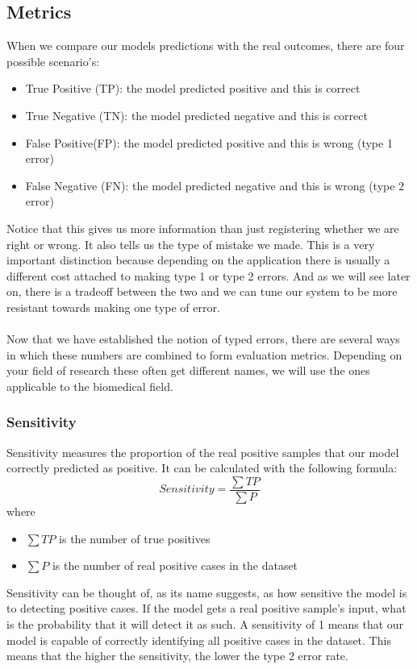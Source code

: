 \subsection{Metrics}
When we compare our models predictions with the real outcomes, there are four possible scenario's:
\begin{itemize}
	\item True Positive (TP): the model predicted positive and this is correct
	\item True Negative (TN): the model predicted negative and this is correct
	\item False Positive(FP): the model predicted positive and this is wrong (type 1 error)
	\item False Negative (FN): the model predicted negative and this is wrong (type 2 error)
\end{itemize}
Notice that this gives us more information than just registering whether we are right or wrong. It also tells us the type of mistake we made. This is a very important distinction because depending on the application there is usually a different cost attached to making type 1 or type 2 errors. And as we will see later on, there is a tradeoff between the two and we can tune our system to be more resistant towards making one type of error. \\ \\
Now that we have established the notion of typed errors, there are several ways in which these numbers are combined to form evaluation metrics. Depending on your field of research these often get different names, we will use the ones applicable to the biomedical field.
\subsubsection{Sensitivity}
Sensitivity\cite{wikisensspec} measures the proportion of the real positive samples that our model correctly predicted as positive. It can be calculated with the following formula:
$$
Sensitivity = \frac{\sum{TP}}{\sum{P}}
$$
where
\begin{itemize}
	\item $\sum{TP}$ is the number of true positives
	\item $\sum{P}$ is the number of real positive cases in the dataset
\end{itemize}
Sensitivity can be thought of, as its name suggests, as how sensitive the model is to detecting positive cases. If the model gets a real positive sample's input, what is the probability that it will detect it as such. A sensitivity of 1 means that our model is capable of correctly identifying all positive cases in the dataset. This means that the higher the sensitivity, the lower the type 2 error rate.
